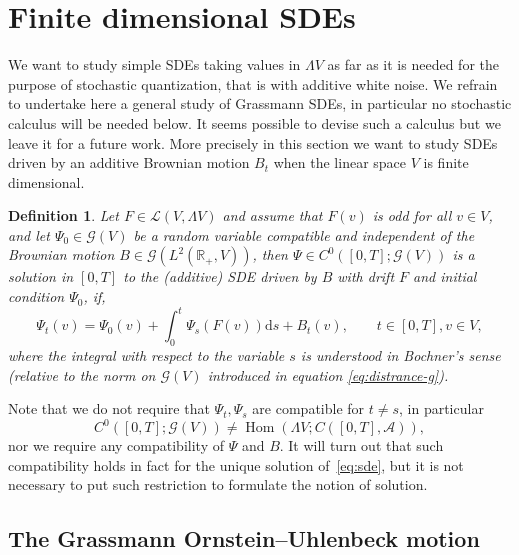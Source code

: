 \documentclass{article}
\newcommand{\mathd}{\mathrm{d}}
\newcommand{\tmop}[1]{\ensuremath{\operatorname{#1}}}
\newtheorem{definition}[theorem]{Definition}
\begin{document}
\section{Finite dimensional SDEs}\label{sec:finite-dim}

We want to study simple SDEs taking values in $\Lambda V$ as far as it is
needed for the purpose of stochastic quantization, that is with additive white
noise. We refrain to undertake here a general study of Grassmann SDEs, in
particular no stochastic calculus will be needed below. It seems possible to
devise such a calculus but we leave it for a future work. More precisely in
this section we want to study SDEs driven by an additive Brownian motion $B_t$
when the linear space $V$ is finite dimensional.

\begin{definition}
  Let $F \in \mathcal{L} (V, \Lambda V)$ and assume that $F (v)$ is odd for
  all $v \in V$, and let $\Psi_0 \in \mathcal{G} (V)$ be a random variable
  compatible and independent of the Brownian motion $B \in \mathcal{G} (L^2
  (\mathbb{R}_+, V))$, then $\Psi \in C^0 ([0, T] ; \mathcal{G} (V))$ is a
  solution in $[0, T]$ to the (additive) SDE driven by $B$ with drift $F$ and
  initial condition $\Psi_0$, if,
  \begin{equation}
    \Psi_t (v) = \Psi_0 (v) + \int_0^t \Psi_s (F (v)) \mathd s + B_t (v),
    \qquad t \in [0, T], v \in V, \label{eq:sde}
  \end{equation}
  where the integral with respect to the variable $s$ is understood in
  Bochner's sense (relative to the norm on $\mathcal{G} (V)$ introduced in
  equation {\eqref{eq:distrance-g}}).
\end{definition}

\begin{remark}
  Note that we do not require that $\Psi_t, \Psi_s$ are compatible for $t \neq
  s$, in particular
  \[ C^0 ([0, T] ; \mathcal{G} (V)) \neq \tmop{Hom} (\Lambda V ; C ([0, T],
     \mathcal{A})), \]
  nor we require any compatibility of $\Psi$ and $B$. It will turn out that
  such compatibility holds in fact for the unique solution
  of~{\eqref{eq:sde}}, but it is not necessary to put such restriction to
  formulate the notion of solution.
\end{remark}

\subsection{The Grassmann Ornstein--Uhlenbeck motion}\label{sec:ou}
\end{document}
